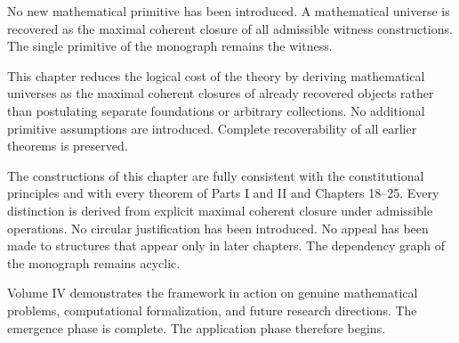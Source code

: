 \documentclass[12pt,anyside]{book}
\begin{document}
\begin{primitiveaudit}
No new mathematical primitive has been introduced. A mathematical universe is recovered as the maximal coherent closure of all admissible witness constructions. The single primitive of the monograph remains the witness.
\end{primitiveaudit}

\begin{reductionaudit}
This chapter reduces the logical cost of the theory by deriving mathematical universes as the maximal coherent closures of already recovered objects rather than postulating separate foundations or arbitrary collections. No additional primitive assumptions are introduced. Complete recoverability of all earlier theorems is preserved.
\end{reductionaudit}

\begin{consistencyaudit}
The constructions of this chapter are fully consistent with the constitutional principles and with every theorem of Parts I and II and Chapters 18--25. Every distinction is derived from explicit maximal coherent closure under admissible operations. No circular justification has been introduced. No appeal has been made to structures that appear only in later chapters. The dependency graph of the monograph remains acyclic.
\end{consistencyaudit}

\begin{futurework}
Volume IV demonstrates the framework in action on genuine mathematical problems, computational formalization, and future research directions. The emergence phase is complete. The application phase therefore begins.
\end{futurework}
\end{document}

